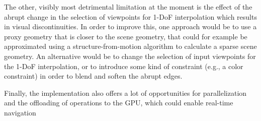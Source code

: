 
The other, visibly most detrimental limitation at the moment is the effect of the abrupt change in the selection of viewpoints for 1-DoF interpolation which results in visual discontinuities.  
In order to improve this, one approach would be to use a proxy geometry that is closer to the scene geometry, that could for example be approximated using a structure-from-motion algorithm to calculate a sparse scene geometry. An alternative would be to change the selection of input viewpoints for the 1-DoF interpolation, or to introduce some kind of constraint (e.g., a color constraint) in order to blend and soften the abrupt edges.

Finally, the implementation also offers a lot of opportunities for parallelization and the offloading of operations to the GPU, which could enable real-time navigation 


